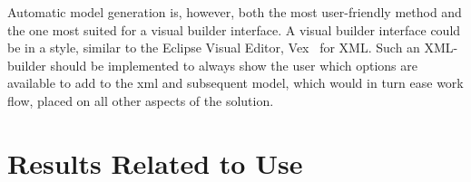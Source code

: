 Automatic model generation is, however, both the most user-friendly method and the one most suited for a visual builder interface. A visual builder interface could be in a style, similar to the Eclipse Visual Editor, Vex~\cite{vex} for XML. Such an XML-builder should be implemented to always show the user which options are available to add to the xml and subsequent model, which would in turn ease work flow, placed on all other aspects of the solution.

\section{Results Related to Use}
\TODOWRITE